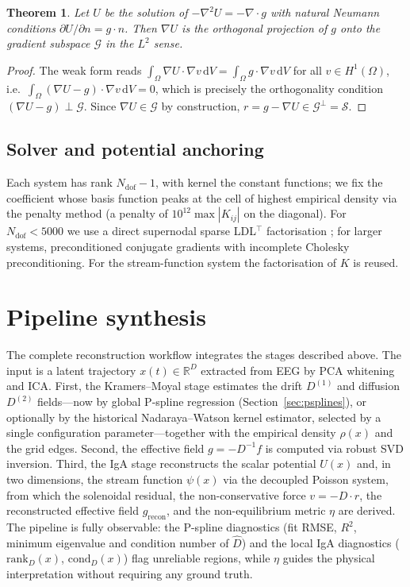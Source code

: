 \documentclass[11pt,a4paper]{article}
\newtheorem{theorem}{Theorem}[section]
\newcommand{\R}{\mathbb{R}}
\newcommand{\dd}{\mathrm{d}}
\newcommand{\topT}{^{\top}}
\newcommand{\grad}{\nabla}
\newcommand{\Div}{\nabla\!\cdot\!}
\newcommand{\Drift}{D^{(1)}}
\newcommand{\Diff}{D^{(2)}}
\begin{document}
\begin{theorem}
Let $U$ be the solution of $-\grad^2 U = -\Div g$ with natural Neumann
conditions $\partial U / \partial n = g \cdot n$. Then $\grad U$ is the
orthogonal projection of $g$ onto the gradient subspace $\mathcal{G}$ in the
$L^2$ sense.
\end{theorem}
\begin{proof}
The weak form reads $\int_\Omega \grad U \cdot \grad v \, \dd V = \int_\Omega g
\cdot \grad v \, \dd V$ for all $v \in H^1(\Omega)$, i.e.\
$\int_\Omega (\grad U - g) \cdot \grad v \, \dd V = 0$, which is precisely the
orthogonality condition $(\grad U - g) \perp \mathcal{G}$. Since $\grad U \in
\mathcal{G}$ by construction, $r = g - \grad U \in \mathcal{G}^{\perp} =
\mathcal{S}$.
\end{proof}

\subsection{Solver and potential anchoring}

Each system has rank $N_{\mathrm{dof}} - 1$, with kernel the constant
functions; we fix the coefficient whose basis function peaks at the cell of
highest empirical density via the penalty method (a penalty of $10^{12}
\max|K_{ij}|$ on the diagonal). For $N_{\mathrm{dof}} < 5000$ we use a direct
supernodal sparse LDL$\topT$ factorisation \cite{golub2013}; for larger
systems, preconditioned conjugate gradients with incomplete Cholesky
preconditioning. For the stream-function system the factorisation of $K$ is
reused.

\section{Pipeline synthesis}

The complete reconstruction workflow integrates the stages described above.
The input is a latent trajectory $x(t) \in \R^D$ extracted from EEG by PCA
whitening and ICA. First, the Kramers--Moyal stage estimates the drift
$\Drift$ and diffusion $\Diff$ fields---now by global P-spline regression
(Section~\ref{sec:psplines}), or optionally by the historical
Nadaraya--Watson kernel estimator, selected by a single configuration
parameter---together with the empirical density $\rho(x)$ and the grid edges.
Second, the effective field $g = -D^{-1} f$ is computed via robust SVD
inversion. Third, the IgA stage reconstructs the scalar potential $U(x)$ and,
in two dimensions, the stream function $\psi(x)$ via the decoupled Poisson
system, from which the solenoidal residual, the non-conservative force
$v = -D \cdot r$, the reconstructed effective field $g_{\mathrm{recon}}$, and
the non-equilibrium metric $\eta$ are derived. The pipeline is fully
observable: the P-spline diagnostics (fit RMSE, $R^2$, minimum eigenvalue and
condition number of $\hat D$) and the local IgA diagnostics
($\mathrm{rank}_D(x)$, $\mathrm{cond}_D(x)$) flag unreliable regions, while
$\eta$ guides the physical interpretation without requiring any ground truth.
\end{document}
